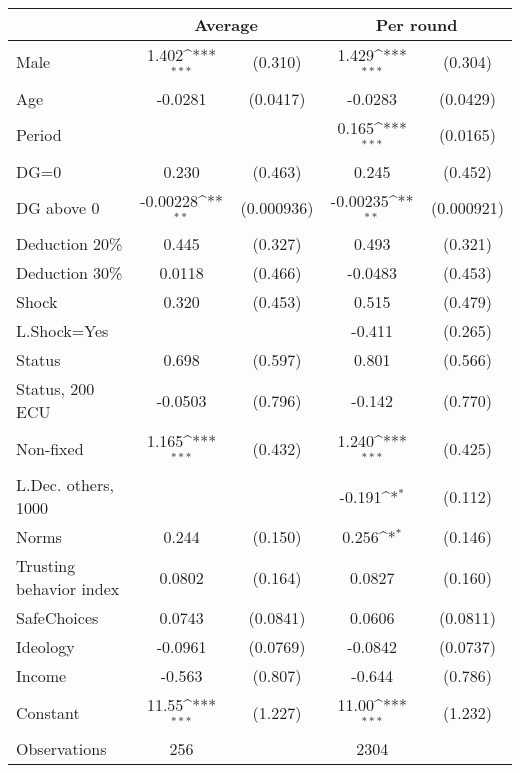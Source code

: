 {
\def\sym#1{\ifmmode^{#1}\else\(^{#1}\)\fi}
\begin{tabular}{p{10cm}*{2}{cc}}
\hline\hline
                &\multicolumn{2}{c}{Average} &\multicolumn{2}{c}{Per round}\\
\hline
Male            &    1.402\sym{***}&  (0.310)&    1.429\sym{***}&  (0.304)\\
Age             &  -0.0281         & (0.0417)&  -0.0283         & (0.0429)\\
Period          &                  &         &    0.165\sym{***}& (0.0165)\\
DG=0            &    0.230         &  (0.463)&    0.245         &  (0.452)\\
DG above 0      & -0.00228\sym{**} &(0.000936)& -0.00235\sym{**} &(0.000921)\\
Deduction 20\%  &    0.445         &  (0.327)&    0.493         &  (0.321)\\
Deduction 30\%  &   0.0118         &  (0.466)&  -0.0483         &  (0.453)\\
Shock           &    0.320         &  (0.453)&    0.515         &  (0.479)\\
L.Shock=Yes     &                  &         &   -0.411         &  (0.265)\\
Status          &    0.698         &  (0.597)&    0.801         &  (0.566)\\
Status, 200 ECU &  -0.0503         &  (0.796)&   -0.142         &  (0.770)\\
Non-fixed       &    1.165\sym{***}&  (0.432)&    1.240\sym{***}&  (0.425)\\
L.Dec. others, 1000&                  &         &   -0.191\sym{*}  &  (0.112)\\
Norms           &    0.244         &  (0.150)&    0.256\sym{*}  &  (0.146)\\
Trusting behavior index&   0.0802         &  (0.164)&   0.0827         &  (0.160)\\
SafeChoices     &   0.0743         & (0.0841)&   0.0606         & (0.0811)\\
Ideology        &  -0.0961         & (0.0769)&  -0.0842         & (0.0737)\\
Income          &   -0.563         &  (0.807)&   -0.644         &  (0.786)\\
Constant        &    11.55\sym{***}&  (1.227)&    11.00\sym{***}&  (1.232)\\
\hline
Observations    &      256         &         &     2304         &         \\

\end{tabular}}
